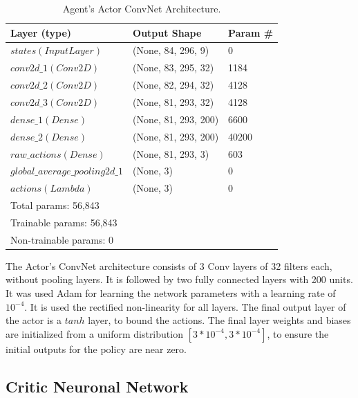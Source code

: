 \documentclass[peerreview,onecolumn]{IEEEtran}
\begin{document}
	 \begin{table}[h] 
	\centering
	\begin{tabular}{l l l} 
		\toprule 
		Layer (type) & Output Shape & Param \# \\ 		
		\midrule
		$states (InputLayer)$ & (None, 84, 296, 9) & 0\\ 
		$conv2d\_1 (Conv2D)$ & (None, 83, 295, 32) & 1184  \\ 
		$conv2d\_2 (Conv2D)$ & (None, 82, 294, 32) & 4128  \\
		$conv2d\_3 (Conv2D)$ & (None, 81, 293, 32) & 4128  \\
		$dense\_1 (Dense)$  & (None, 81, 293, 200) & 6600  \\   
		$dense\_2 (Dense)$ & (None, 81, 293, 200)  & 40200 \\
		$raw\_actions (Dense)$ & (None, 81, 293, 3) & 603  \\
		$global\_average\_pooling2d\_1$ & (None, 3) & 0  \\
		$actions (Lambda)$ & (None, 3) &  0 \\
		\midrule 
		\midrule
		Total params: 56,843 & &  \\
		Trainable params: 56,843 & &  \\
		Non-trainable params: 0 & & \\

		\bottomrule 
	\end{tabular}
	\smallskip 
	\caption{Agent's Actor ConvNet Architecture.} 
	\label{tab:actor_arch} 
\end{table}

The Actor's ConvNet architecture consists of 3 Conv layers of 32 filters each, without pooling layers. It is followed by two fully connected layers with 200 units. It was used Adam \cite{adam_2014} for learning the network parameters with a learning rate of $10^{-4}$. It is used the rectified non-linearity \cite{relu_2011} for all layers. The final output layer of the actor is a $tanh$ layer, to bound the actions. The final layer weights and biases are initialized from a uniform distribution $[3 * 10^{-4}, 3 * 10^{-4}]$, to ensure the initial outputs for the policy are near zero.
	 
	 \subsection{Critic Neuronal Network}
	 
\end{document}
